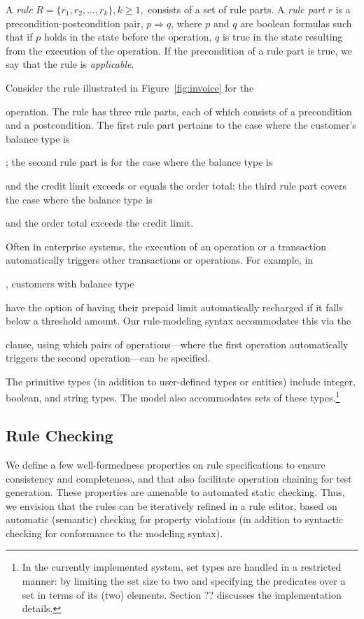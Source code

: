 A \textit{rule} $R = \{r_1, r_2, \ldots, r_k\}, k \geq 1,$ consists of a set of
rule parts. A \textit{rule part} $r$ is a precondition-postcondition pair, $p
\Longrightarrow q$, where $p$ and $q$ are boolean formulas such that if $p$
holds in the state before the operation, $q$ is true in the state resulting from
the execution of the operation. If the precondition of a rule part is true, we
say that the rule is \textit{applicable}.

Consider the rule illustrated in Figure~\ref{fig:invoice} for the
\subject{Compute Invoice Total} operation. The rule has three rule parts, each
of which consists of a precondition and a postcondition. The first rule part
pertains to the case where the customer's balance type is \subject{None}; the
second rule part is for the case where the balance type is \subject{Credit} and
the credit limit exceeds or equals the order total; the third rule part covers
the case where the balance type is \subject{Credit} and the order total exceeds
the credit limit.

Often in enterprise systems, the execution of an operation or a transaction
automatically triggers other transactions or operations. For example, in
\subject{JBilling}, customers with balance type \subject{Prepaid} have the
option of having their prepaid limit automatically recharged if it falls below a
threshold amount. Our rule-modeling syntax accommodates this via the
\subject{Triggers} clause, using which pairs of operations---where the first
operation automatically triggers the second operation---can be specified.

The primitive types (in addition to user-defined types or entities) include
integer, boolean, and string types. The model also accommodates sets of these
types.\footnote{\small In the currently implemented system, set types are
  handled in a restricted manner: by limiting the set size to two and specifying
  the predicates over a set in terms of its (two) elements. Section ??
  discusses the implementation details.}

\subsection{Rule Checking}
\label{sec:checking}
 
We define a few well-formedness properties on rule specifications to ensure
consistency and completeness, and that also facilitate operation chaining for
test generation. These properties are amenable to automated static
checking. Thus, we envision that the rules can be iteratively refined in a rule
editor, based on automatic (semantic) checking for property violations (in
addition to syntactic checking for conformance to the modeling syntax).

